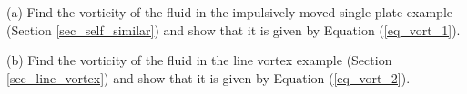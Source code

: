 



\begin{problem}
\label{prob_vorticity}

(a) Find the vorticity of the fluid in the impulsively moved single plate example (Section \ref{sec_self_similar}) and show that it is given by Equation (\ref{eq_vort_1}).

(b) Find the vorticity of the fluid in the line vortex example (Section \ref{sec_line_vortex}) and show that it is given by Equation (\ref{eq_vort_2}).
\end{problem}



